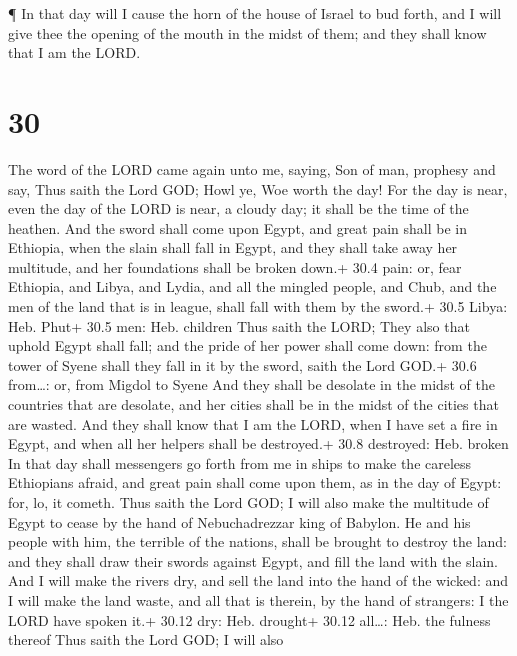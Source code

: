  ¶ In that day will I cause the horn of the house of Israel
to bud forth, and I will give thee the opening of the mouth in the midst
of them; and they shall know that I am the LORD.

\hypertarget{section-29}{%
\section{30}\label{section-29}}

 The word of the LORD came again unto me, saying,
 Son of man, prophesy and say, Thus saith the Lord GOD; Howl
ye, Woe worth the day!  For the day is near, even the day of
the LORD is near, a cloudy day; it shall be the time of the heathen.
 And the sword shall come upon Egypt, and great pain shall
be in Ethiopia, when the slain shall fall in Egypt, and they shall take
away her multitude, and her foundations shall be broken down.+ 30.4
pain: or, fear  Ethiopia, and Libya, and Lydia, and all the
mingled people, and Chub, and the men of the land that is in league,
shall fall with them by the sword.+ 30.5 Libya: Heb. Phut+ 30.5 men:
Heb. children  Thus saith the LORD; They also that uphold
Egypt shall fall; and the pride of her power shall come down: from the
tower of Syene shall they fall in it by the sword, saith the Lord GOD.+
30.6 from\ldots: or, from Migdol to Syene  And they shall be
desolate in the midst of the countries that are desolate, and her cities
shall be in the midst of the cities that are wasted.  And
they shall know that I am the LORD, when I have set a fire in Egypt, and
when all her helpers shall be destroyed.+ 30.8 destroyed: Heb. broken
 In that day shall messengers go forth from me in ships to
make the careless Ethiopians afraid, and great pain shall come upon
them, as in the day of Egypt: for, lo, it cometh.  Thus
saith the Lord GOD; I will also make the multitude of Egypt to cease by
the hand of Nebuchadrezzar king of Babylon.  He and his
people with him, the terrible of the nations, shall be brought to
destroy the land: and they shall draw their swords against Egypt, and
fill the land with the slain.  And I will make the rivers
dry, and sell the land into the hand of the wicked: and I will make the
land waste, and all that is therein, by the hand of strangers: I the
LORD have spoken it.+ 30.12 dry: Heb. drought+ 30.12 all\ldots: Heb. the
fulness thereof  Thus saith the Lord GOD; I will also
